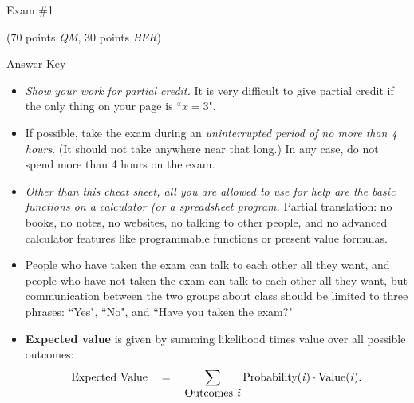 \documentclass[twoside]{article}
\begin{document}
\pagestyle{empty}
\thispagestyle{empty}

\vspace*{-3cm}
\enlargethispage{4\baselineskip}
\begin{center}
\Large Exam \#1 \begin{EXAM}(70 points \emph{QM}, 30 points \emph{BER})\end{EXAM} \begin{KEY} Answer Key \end{KEY}
\end{center}
\normalsize
\bigskip

\begin{EXAM}

\begin{itemize}
\begin{comment}
\item Other than this cheat sheet (which you should tear off), all you are allowed to use for help are the basic
functions on a calculator.

\item The space provided below each question should be sufficient for your answer, but you can use additional paper if
needed.
\end{comment}

\item \emph{Show your work for partial credit.} It is very difficult to give partial credit if the only thing on your
page is ``$x=3$".


\item If possible, take the exam during an \emph{uninterrupted period of no more than 4 hours}. (It should not take anywhere near that long.) In any case, do not spend more than 4 hours on the exam.

\item \emph{Other than this cheat sheet, all you are allowed to use for help are the basic functions on a calculator (or a spreadsheet program.}
Partial translation: no books, no notes, no websites, no talking to other people, and no advanced calculator features
like programmable functions or present value formulas.

\item People who have taken the exam can talk to each other all they want, and people who have not taken the exam can
talk to each other all they want, but communication between the two groups about class should be limited to three
phrases: ``Yes", ``No", and ``Have you taken the exam?"


\item \textbf{Expected value} is given by summing likelihood times value over all possible outcomes:
\[
\mbox{Expected Value}\ \ \  = \ \ \ \sum_{\mbox{Outcomes \emph{i}}} \mbox{Probability(\emph{i})} \cdot
\mbox{Value(\emph{i})}.
\]



\end{itemize}
\end{EXAM}
\end{document}
